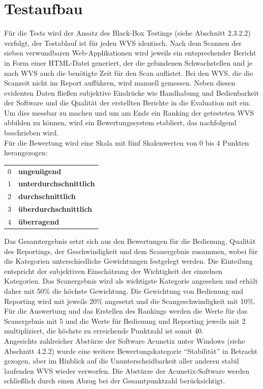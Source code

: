 \documentclass[12pt,oneside,a4paper,parskip,pointlessnumbers]{scrbook}
\begin{document}
  \section{Testaufbau}
  Für die Tests wird der Ansatz des Black-Box Testings (siehe Abschnitt 2.3.2.2) verfolgt, der Testablauf ist für jeden WVS identisch.
  Nach dem Scannen der sieben verwundbaren Web-Applikationen wird jeweils ein entsprechender Bericht in Form einer HTML-Datei generiert, der die gefundenen Schwachstellen und je nach WVS auch die benötigte Zeit für den Scan auflistet. Bei den WVS, die die Scanzeit nicht im Report aufführen, wird manuell gemessen.
  Neben diesen evidenten Daten fließen subjektive Eindrücke wie Handhabung und Bedienbarkeit der Software und die Qualität der erstellten Berichte in die Evaluation mit ein.\\
  Um dies messbar zu machen und um am Ende ein Ranking der getesteten WVS abbilden zu können, wird ein Bewertungssystem etabliert, das nachfolgend beschrieben wird.\\
  Für die Bewertung wird eine Skala mit fünf Skalenwerten von 0 bis 4 Punkten herangezogen:
  \begin{table}[H]
     \begin{tabular}{ll}
     0         & \textbf{ungenügend}             \\
     1         & \textbf{unterdurchschnittlich}  \\
     2         & \textbf{durchschnittlich}       \\
     3         & \textbf{überdurchschnittlich}   \\
     4         & \textbf{überragend}
     \end{tabular}
   \end{table}
   Das Gesamtergebnis setzt sich aus den Bewertungen für die Bedienung, Qualität des Reportings, der Geschwindigkeit und dem Scanergebnis zusammen, wobei für die Kategorien unterschiedliche Gewichtungen festgelegt werden. Die Einteilung entspricht der subjektiven Einschätzung der Wichtigkeit der einzelnen Kategorien. Das Scanergebnis wird als wichtigste Kategorie angesehen und erhält daher mit 50\% die höchste Gewichtung. Die Gewichtung von Bedienung und Reporting wird mit jeweils 20\% angesetzt und die Scangeschwindigkeit mit 10\%.
   Für die Auswertung und das Erstellen des Rankings werden die Werte für das Scanergebnis mit 5 und die Werte für Bedienung und Reporting jeweils mit 2 multipliziert, die höchste zu erreichende Punktzahl ist somit 40.\\
   Angesichts zahlreicher Abstürze der Software Acunetix unter Windows (siehe Abschnitt 4.2.2) wurde eine weitere Bewertungskategorie ``Stabilität'' in Betracht gezogen, aber im Hinblick auf die Ununterscheidbarkeit aller anderen stabil laufenden WVS wieder verworfen. Die Abstürze der Acunetix-Software werden schließlich durch einen Abzug bei der Gesamtpunktzahl berücksichtigt.
\end{document}
